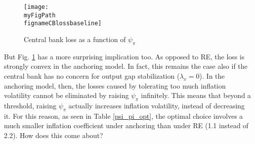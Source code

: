 \documentclass[11pt]{article}
\def \myFigPath {../../figures/}
\renewcommand{\[}{\begin{equation}}
\renewcommand{\]}{\end{equation}}
\def\fignameCBlossbaseline{plot_sim_loss_approx_pretty_losses_again_critsmooth_constant_only_pi_only_lamx0_05_lami0_2020_09_19}
\begin{document}
\begin{figure}[h!]
\texttt{[image: \\myFigPath \\fignameCBlossbaseline]}
\caption{Central bank loss as a function of $\psi_{\pi}$}
\label{fig_loss}
\end{figure}



But Fig. \ref{fig_loss} has a more surprising implication too. As opposed to RE, the loss is strongly convex in the anchoring model. In fact, this remains the case also if the central bank has no concern for output gap stabilization ($\lambda_x = 0$). In the anchoring model, then, the losses caused by tolerating too much inflation volatility cannot be eliminated by raising $\psi_{\pi}$ infinitely. This means that beyond a threshold, raising $\psi_{\pi}$ actually increases inflation volatility, instead of decreasing it. For this reason, as seen in Table \ref{psi_pi_opt}, the optimal choice involves a much smaller inflation coefficient under anchoring than under RE (1.1 instead of 2.2). How does this come about?
\end{document}

